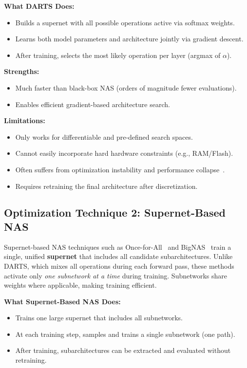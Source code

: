 \textbf{What DARTS Does:}
\begin{itemize}
    \item Builds a supernet with all possible operations active via softmax weights.
    \item Learns both model parameters and architecture jointly via gradient descent.
    \item After training, selects the most likely operation per layer (argmax of $\alpha$).
\end{itemize}

\textbf{Strengths:}
\begin{itemize}
    \item Much faster than black-box NAS (orders of magnitude fewer evaluations).
    \item Enables efficient gradient-based architecture search.
\end{itemize}

\textbf{Limitations:}
\begin{itemize}
    \item Only works for differentiable and pre-defined search spaces.
    \item Cannot easily incorporate hard hardware constraints (e.g., RAM/Flash).
    \item Often suffers from optimization instability and performance collapse~\cite{zela2020understanding}.
    \item Requires retraining the final architecture after discretization.
\end{itemize}

\subsection{Optimization Technique 2: Supernet-Based NAS}
Supernet-based NAS techniques such as Once-for-All~\cite{cai2019once} and BigNAS~\cite{yu2020bignas} train a single, unified \textbf{supernet} that includes all candidate subarchitectures. Unlike DARTS, which mixes all operations during each forward pass, these methods activate only \textit{one subnetwork at a time} during training. Subnetworks share weights where applicable, making training efficient.

\textbf{What Supernet-Based NAS Does:}
\begin{itemize}
    \item Trains one large supernet that includes all subnetworks.
    \item At each training step, samples and trains a single subnetwork (one path).
    \item After training, subarchitectures can be extracted and evaluated without retraining.
\end{itemize}

